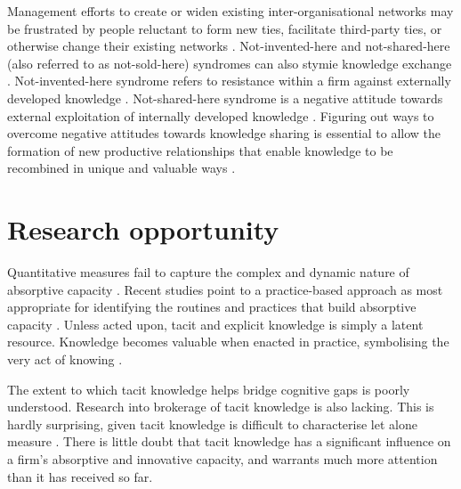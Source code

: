 {{Management efforts to create or widen existing inter-organisational networks may be frustrated by people reluctant to form new ties, facilitate third-party ties, or otherwise change their existing networks \citep{davis2010agency}. Not-invented-here and not-shared-here (also referred to as not-sold-here) syndromes can also stymie knowledge exchange \citep{lichtenthaler2006attitudes,lichtenthaler2011your,de2014neither,podmetina2015skills,chesbrough2017future}. Not-invented-here syndrome refers to resistance within a firm against externally developed knowledge \citep{katz1982investigating,hussinger2011search,antons2015opening}. Not-shared-here syndrome is a negative attitude towards external exploitation of internally developed knowledge \citep{chesbrough2003open,lichtenthaler2006attitudes,de2014neither}. Figuring out ways to overcome negative attitudes towards knowledge sharing is essential to allow the formation of new productive relationships that enable knowledge to be recombined in unique and valuable ways \citep{uzzi1997social,nahapiet1998social,obstfeld2005social,lane2006reification,davis2010agency,meyer2010rise}.\medskip

\section{Research opportunity}

Quantitative measures fail to capture the complex and dynamic nature of absorptive capacity \citep{easterby2008absorptive,duchek2013capturing}. Recent studies point to a practice-based approach as most appropriate for identifying the routines and practices that build absorptive capacity \citep[e.g.][]{duchek2013capturing,omidvar2013revisiting,marabelli2012knowledge,marabelli2014knowing}. Unless acted upon, tacit and explicit knowledge is simply a latent resource. Knowledge becomes valuable when enacted in practice, symbolising the very act of knowing \citep{cook1999bridging,duguid2005art,marabelli2014knowing,freeman2015knowledge}. 


The extent to which tacit knowledge helps bridge cognitive gaps is poorly understood. Research into brokerage of tacit knowledge is also lacking. This is hardly surprising, given tacit knowledge is difficult to characterise let alone measure \citep{zander1995knowledge,cavusgil2003tacit}. 
There is little doubt that tacit knowledge has a significant influence on a firm's absorptive and innovative capacity, and warrants much more attention than it has received so far.  
\medskip

}}
